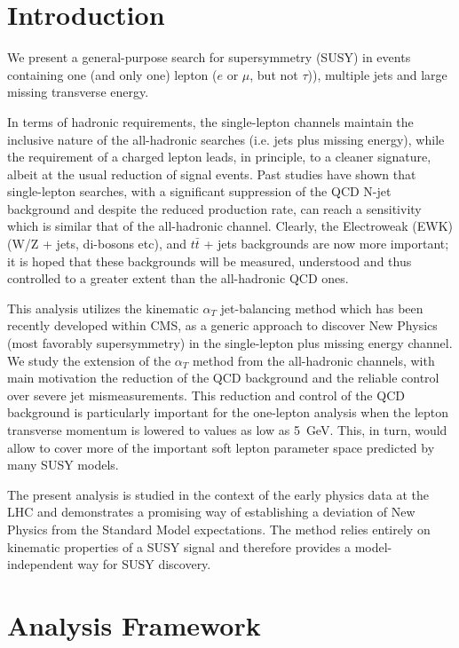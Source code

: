 \section{Introduction}
\label{sec:intro}

We present a general-purpose search for supersymmetry (SUSY) in events containing one (and only one) lepton ($e$ or $\mu$, but not $\tau$)), multiple jets and large missing transverse energy. 

In terms of hadronic requirements, the single-lepton channels maintain the inclusive nature of the all-hadronic searches (i.e. jets plus missing energy), while the requirement of a charged lepton leads, in principle, to a cleaner signature, albeit at the usual reduction of signal events. Past studies have shown that single-lepton searches, with a significant suppression of the QCD N-jet background and despite the reduced production rate, can reach a sensitivity which is similar that of the all-hadronic channel. Clearly, the Electroweak (EWK) (W/Z + jets, di-bosons etc), and $t\bar{t}$ + jets backgrounds are now more important; it is hoped that these backgrounds will be measured, understood and thus controlled to a greater extent than the all-hadronic QCD ones.

This analysis utilizes the kinematic $\alpha_{T}$ jet-balancing method which has been recently developed within CMS, as a generic approach to discover New Physics (most favorably supersymmetry) in the single-lepton plus missing energy channel. We study the extension of the $\alpha_{T}$ method from the all-hadronic channels, with main motivation the reduction of the QCD background and the reliable control over severe jet mismeasurements. This reduction and control of the QCD background is particularly important for the one-lepton analysis when the lepton transverse momentum is lowered to values as low as 5~GeV. This, in turn, would allow to cover more of the important soft lepton parameter space predicted by many SUSY models.

The present analysis is studied in the context of the early physics data at the LHC and demonstrates a promising way of establishing a deviation of New Physics from the Standard Model expectations. The method relies entirely on kinematic properties of a SUSY signal and therefore provides a model-independent way for SUSY discovery.

\section{Analysis Framework}
\label{sec:framework}

